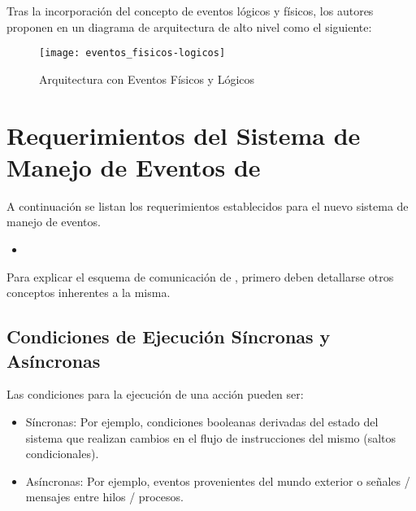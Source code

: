 Tras la incorporación del concepto de eventos lógicos y físicos, los autores
proponen en \cite{chimp} un diagrama de arquitectura de alto nivel como el
siguiente:

\begin{figure}[h]
	\centering
	\texttt{[image: eventos\_fisicos-logicos]}
	\caption{Arquitectura con Eventos Físicos y Lógicos}
	\label{fig:eventos_fisicos-logicos}
\end{figure}





\section{Requerimientos del Sistema de Manejo de Eventos de \nombreFramework}
A continuación se listan los requerimientos establecidos para el nuevo sistema
de manejo de eventos.

\begin{itemize}
  \item 
\end{itemize}



Para explicar el esquema de comunicación de \nombreFramework , primero deben
detallarse otros conceptos inherentes a la misma.


\subsection{Condiciones de Ejecución Síncronas y Asíncronas}
Las condiciones para la ejecución de una acción pueden ser:
  \begin{itemize}
	\item Síncronas: Por ejemplo, condiciones booleanas derivadas del estado del
		sistema que realizan cambios en el flujo de instrucciones del mismo (saltos
		condicionales).
	\item Asíncronas: Por ejemplo, eventos provenientes del mundo exterior o
		señales / mensajes entre hilos / procesos.
  \end{itemize}
  
